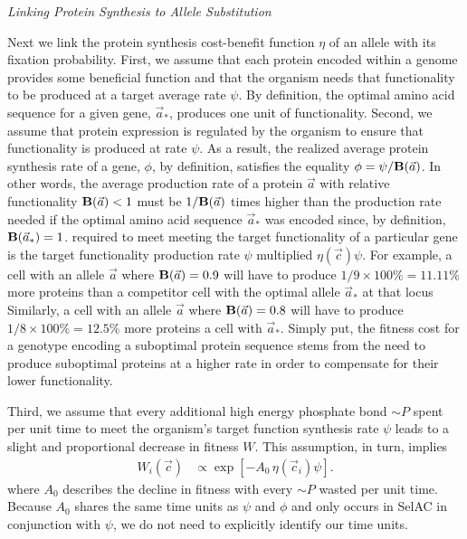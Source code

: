 \documentclass[12pt,letterpaper]{article}
\renewcommand{\subsection}[1]{%
\bigskip
\begin{center}
\begin{large}
\normalfont\itshape #1
\end{large}
\end{center}}
\newcommand{\Func}{\ensuremath{\text{\textbf{B}}}\xspace}
\newcommand{\simP}{\ensuremath{\sim P}\xspace}
\newcommand{\selac}{SelAC\xspace}
\newcommand{\aoptvec}{\ensuremath{\Vec{a}_*}\xspace}
\newcommand{\avec}{\ensuremath{\Vec{a}}\xspace}
\newcommand{\cveci}{\ensuremath{\cvec_i}\xspace}
\newcommand{\cvec}{\ensuremath{\Vec{c}}\xspace}
\begin{document}
\subsection{Linking Protein Synthesis to Allele Substitution}
Next we link the protein synthesis cost-benefit function $\eta$ of an allele with its fixation probability.
First, we assume that each protein encoded within a genome provides some beneficial function and that the organism needs that functionality to be produced at a target average rate $\psi$.
By definition, the optimal amino acid sequence for a given gene, \aoptvec, produces one unit of functionality.
Second, we assume that protein expression is regulated by the organism to ensure that functionality is produced at rate $\psi$.
As a result, the realized average protein synthesis rate of a gene, $\phi$, by definition, satisfies the equality  $\phi = \psi/\Func(\avec)$.
In other words, the average production rate of a protein \avec with relative functionality $\Func(\avec) < 1$ must be $1/\Func(\avec)$ times higher than the production rate needed if the optimal amino acid sequence \aoptvec was encoded since, by definition, $\Func(\aoptvec) = 1$.
 required to meet meeting the target functionality of a particular gene is the target functionality production rate $\psi$ multiplied  $\eta(\cvec) \psi$.
For example, a cell with an allele \avec where $\Func(\avec) = 0.9$ will have to produce $1/9 \times 100\%=  11.11\%$ more proteins than a competitor cell with the optimal allele \aoptvec at that locus
Similarly, a cell with an allele \avec where $\Func(\avec) = 0.8$ will have to produce $1/8 \times 100\%=  12.5\%$ more proteins a cell with \aoptvec.
Simply put, the fitness cost for a genotype encoding a suboptimal protein sequence stems from the need to produce suboptimal proteins at a higher rate in order to compensate for their lower functionality.


Third, we assume that every additional high energy phosphate bond \simP spent per unit time to meet the organism's target function synthesis rate $\psi$ leads to a slight and proportional decrease in fitness $W$.
This assumption, in turn, implies
\begin{align}
  W_i\left(\cvec\right) &\propto \exp\left[- A_0 \, \eta(\cveci) \psi\right].
\end{align}
where $A_0$ describes the decline in fitness with every \simP wasted per unit time.
Because $A_0$ shares the same time units as $\psi$ and $\phi$ and only occurs in \selac in conjunction with $\psi$, we do not need to explicitly identify our time units.
\end{document}
